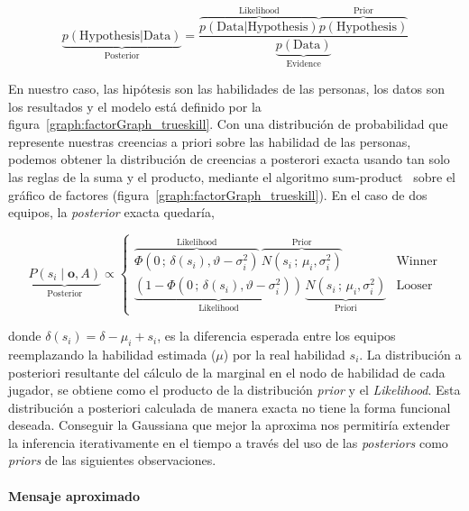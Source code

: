 \documentclass[11pt,twoside, spanish]{report} %
\begin{document}
\begin{equation}\label{eq:inference2}
\underbrace{p(\text{Hypothesis}|\text{Data})}_{\text{Posterior}} = \frac{\overbrace{p(\text{Data}|\text{Hypothesis})}^{\text{Likelihood}}\overbrace{p(\text{Hypothesis})}^{\text{Prior}}}{\underbrace{p(\text{Data})}_{\text{Evidence}}}
\end{equation}

En nuestro caso, las hip\'otesis son las habilidades de las personas, los datos son los resultados y el modelo est\'a definido por la figura~\ref{graph:factorGraph_trueskill}.
Con una distribuci\'on de probabilidad que represente nuestras creencias a priori sobre las habilidad de las personas, podemos obtener la distribuci\'on de creencias a posterori exacta usando tan solo las reglas de la suma y el producto, mediante el algoritmo sum-product~\cite{Kschischang2001} sobre el gr\'afico de factores (figura~\ref{graph:factorGraph_trueskill}).
En el caso de dos equipos, la \textit{posterior} exacta quedar\'ia,

\begin{equation}\label{eq:bayesaprox}
\underbrace{P(s_i \mid \bm{o}, A)}_{\text{Posterior}} \propto
\begin{cases}
 \overbrace{\Phi(0 \, ; \, \delta(s_i), \vartheta - \sigma_i^2)}^{\text{Likelihood}}\,\overbrace{N(s_i \, ; \, \mu_i, \sigma_i^2)}^{\text{Prior}}  & \text{Winner} \\
 \underbrace{(1 - \Phi(0 \, ; \, \delta(s_i), \vartheta - \sigma_i^2))}_{\text{Likelihood}} \,  \underbrace{N(s_i \, ; \, \mu_i, \sigma_i^2 )}_{\text{Priori}}& \text{Looser}
\end{cases}
\end{equation}

donde $\delta(s_i) = \delta - \mu_i + s_i$, es la diferencia esperada entre los equipos reemplazando la habilidad estimada ($\mu$) por la real habilidad $s_i$.
La distribuci\'on a posteriori resultante del c\'alculo de la marginal en el nodo de habilidad de cada jugador, se obtiene como el producto de la distribuci\'on \textit{prior} y el \textit{Likelihood}.
Esta distribuci\'on a posteriori calculada de manera exacta no tiene la forma funcional deseada.
Conseguir la Gaussiana que mejor la aproxima nos permitir\'ia extender la inferencia iterativamente en el tiempo a trav\'es del uso de las \textit{posteriors} como \textit{priors} de las siguientes observaciones.


\paragraph{Mensaje aproximado}
\end{document}
